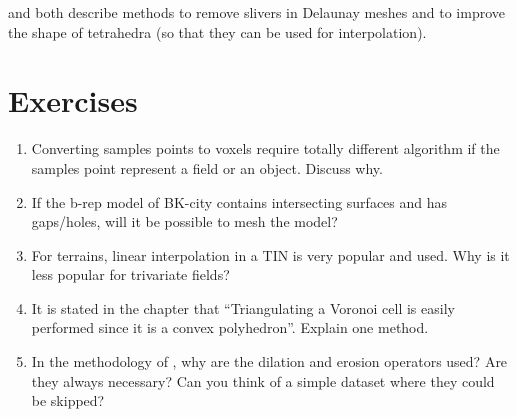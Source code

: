 \citet{Cheng00} and \citet{Miller02} both describe methods to remove slivers in Delaunay meshes and to improve the shape of tetrahedra (so that they can be used for interpolation).

%
\section{Exercises}

\begin{enumerate}
  \item Converting samples points to voxels require totally different algorithm if the samples point represent a field or an object. Discuss why.
  \item If the b-rep model of BK-city contains intersecting surfaces and has gaps/holes, will it be possible to mesh the model?
  \item For terrains, linear interpolation in a TIN is very popular and used. Why is it less popular for trivariate fields?
  \item It is stated in the chapter that ``Triangulating a Voronoi cell is easily performed since it is a convex polyhedron''. Explain one method.
  \item In the methodology of \citet{Donkers16}, why are the dilation and erosion operators used? Are they always necessary? Can you think of a simple dataset where they could be skipped?
\end{enumerate}
